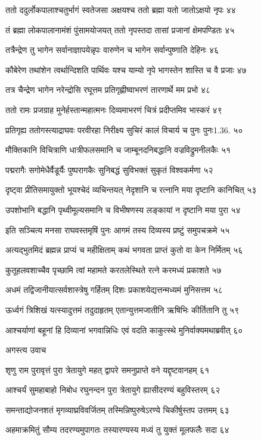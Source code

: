 ततो ददुर्लोकपालाश्चतुर्भागं स्वतेजसा
अक्षयश्च ततो ब्रह्मा यतो जातोऽक्षयो नृपः ४४

तं ब्रह्मा लोकपालानामंशं पुंसामयोजयत्
ततो नृपस्तदा तासां प्रजानां क्षेमपण्डितः ४५

तत्रैन्द्रेण तु भागेन सर्वानाज्ञापयेन्नृपः
वारुणेन च भागेन सर्वान्पुष्णाति देहिनः ४६

कौबेरेण तथांशेन त्वर्थान्दिशति पार्थिवः
यश्च याम्यो नृपे भागस्तेन शास्ति च वै प्रजाः ४७

तत्र चैन्द्रेण भागेन नरेन्द्रोसि रघूत्तम
प्रतिगृह्णीष्वाभरणं तारणार्थे मम प्रभो ४८

ततो रामः प्रजग्राह मुनेर्हस्तान्महात्मनः
दिव्यमाभरणं चित्रं प्रदीप्तमिव भास्करं ४९

प्रतिगृह्य ततोगस्त्याद्राघवः परवीरहा
निरीक्ष्य सुचिरं कालं विचार्य च पुनः पुनः1.36. ५०

मौक्तिकानि विचित्राणि धात्रीफलसमानि च
जाम्बूनदनिबद्धानि वज्रविद्रुमनीलकैः ५१

पद्मरागैः सगोमेधैर्वैडूर्यैः पुष्परागकैः
सुनिबद्धं सुविभक्तं सुकृतं विश्वकर्मणा ५२

दृष्ट्वा प्रीतिसमायुक्तो भूयश्चेदं व्यचिन्तयत्
नेदृशानि च रत्नानि मया दृष्टानि कानिचित् ५३

उपशोभानि बद्धानि पृथ्वीमूल्यसमानि च
विभीषणस्य लङ्कायां न दृष्टानि मया पुरा ५४

इति सञ्चित्य मनसा राघवस्तमृषिं पुनः
आगमं तस्य दिव्यस्य प्रष्टुं समुपचक्रमे ५५

अत्यद्भुतमिदं ब्रह्मन्न प्राप्यं च महीक्षिताम्
कथं भगवता प्राप्तं कुतो वा केन निर्मितम् ५६

कुतूहलवशाच्चैव पृच्छामि त्वां महामते
करतलेस्थिते रत्ने करमध्यं प्रकाशते ५७

अधमं तद्विजानीयात्सर्वशास्त्रेषु गर्हितम्
दिशः प्रकाशयेद्यत्तन्मध्यमं मुनिसत्तम ५८

ऊर्ध्वगं त्रिशिखं यत्स्यादुत्तमं तदुदाहृतम्
एतान्युत्तमजातीनि ऋषिभिः कीर्तितानि तु ५९

आश्चर्याणां बहूनां हि दिव्यानां भगवान्निधिः
एवं वदति काकुत्स्थे मुनिर्वाक्यमथाब्रवीत् ६०

अगस्त्य उवाच

शृणु राम पुरावृत्तं पुरा त्रेतायुगे महत्
द्वापरे समनुप्राप्ते वने यद्दृष्टवानहम् ६१

आश्चर्यं सुमहाबाहो निबोध रघुनन्दन
पुरा त्रेतायुगे ह्यासीदरण्यं बहुविस्तरम् ६२

समन्ताद्योजनशतं मृगव्याघ्रविवर्जितम्
तस्मिन्निष्पुरुषेऽरण्ये चिकीर्षुस्तप उत्तमम् ६३

अहमाक्रमितुं सौम्य तदरण्यमुपागतः
तस्यारण्यस्य मध्यं तु युक्तं मूलफलैः सदा ६४

